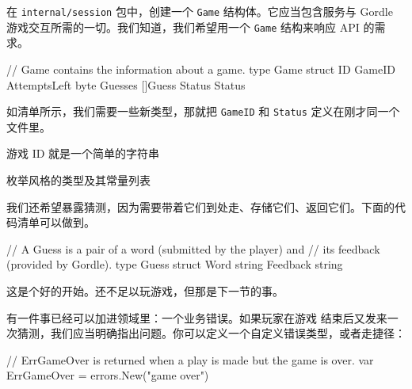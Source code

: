 在 \texttt{internal/session} 包中，创建一个 \texttt{Game} 结构体。它应当包含服务与 Gordle 游戏交互所需的一切。我们知道，我们希望用一个 \texttt{Game} 结构来响应 API 的需求。

\begin{gocode}[title={代码清单 8.18 \texttt{internal/session/game.go}：定义 \texttt{Game} 结构}]
// Game contains the information about a game.
type Game struct {
    ID           GameID
    AttemptsLeft byte
    Guesses      []Guess
    Status       Status
}
\end{gocode}

如清单所示，我们需要一些新类型，那就把 \texttt{GameID} 和 \texttt{Status} 定义在刚才同一个文件里。


\begin{codeannotations}
\item 游戏 ID 就是一个简单的字符串
\item 枚举风格的类型及其常量列表
\end{codeannotations}

我们还希望暴露猜测，因为需要带着它们到处走、存储它们、返回它们。下面的代码清单可以做到。

\begin{gocode}[title={代码清单 8.20 \texttt{game.go}：定义 \texttt{Guess} 类型}]
// A Guess is a pair of a word (submitted by the player) and
// its feedback (provided by Gordle).
type Guess struct {
    Word     string
    Feedback string
}
\end{gocode}

这是个好的开始。还不足以玩游戏，但那是下一节的事。

有一件事已经可以加进领域里：一个业务错误。如果玩家在游戏
结束后又发来一次猜测，我们应当明确指出问题。你可以定义一个自定义错误类型，或者走捷径：

\begin{gocode}[]
// ErrGameOver is returned when a play is made but the game is over.
var ErrGameOver = errors.New("game over")
\end{gocode}

